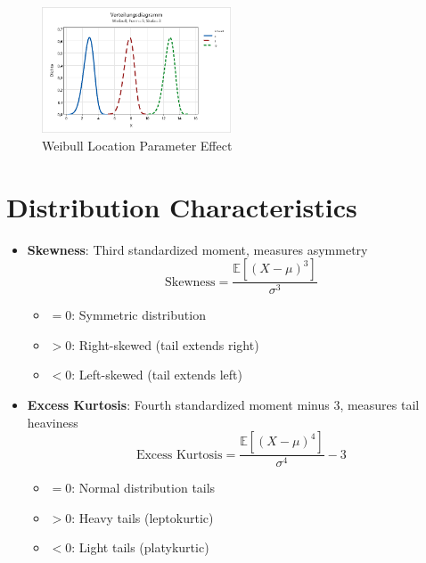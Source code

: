 \documentclass[12pt]{article}
\begin{document}
\begin{figure}[h]
    \centering
    \includegraphics[width=0.5\textwidth]{weibull_location.png}
    \caption{Weibull Location Parameter Effect}
    \label{fig:weibull_location}
\end{figure}

\section{Distribution Characteristics}

\begin{itemize}
    \item \textbf{Skewness}: Third standardized moment, measures asymmetry
    \begin{equation}
        \text{Skewness} = \frac{\mathbb{E}[(X-\mu)^3]}{\sigma^3}
    \end{equation}
    \begin{itemize}
        \item $= 0$: Symmetric distribution
        \item $> 0$: Right-skewed (tail extends right)
        \item $< 0$: Left-skewed (tail extends left)
    \end{itemize}

    \item \textbf{Excess Kurtosis}: Fourth standardized moment minus 3, measures tail heaviness
    \begin{equation}
        \text{Excess Kurtosis} = \frac{\mathbb{E}[(X-\mu)^4]}{\sigma^4} - 3
    \end{equation}
    \begin{itemize}
        \item $= 0$: Normal distribution tails
        \item $> 0$: Heavy tails (leptokurtic)
        \item $< 0$: Light tails (platykurtic)
    \end{itemize}
\end{itemize}
\end{document}
